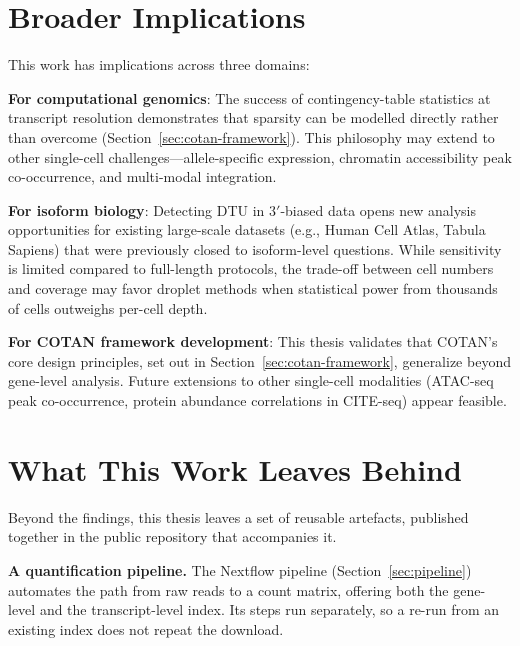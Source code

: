 \section{Broader Implications}

This work has implications across three domains:

\textbf{For computational genomics}: The success of contingency-table statistics at transcript resolution demonstrates that sparsity can be modelled directly rather than overcome (Section~\ref{sec:cotan-framework}). This philosophy may extend to other single-cell challenges---allele-specific expression, chromatin accessibility peak co-occurrence, and multi-modal integration.

\textbf{For isoform biology}: Detecting DTU in $3'$-biased data opens new analysis opportunities for existing large-scale datasets (e.g., Human Cell Atlas, Tabula Sapiens) that were previously closed to isoform-level questions. While sensitivity is limited compared to full-length protocols, the trade-off between cell numbers and coverage may favor droplet methods when statistical power from thousands of cells outweighs per-cell depth.

\textbf{For COTAN framework development}: This thesis validates that COTAN's core design principles, set out in Section~\ref{sec:cotan-framework}, generalize beyond gene-level analysis. Future extensions to other single-cell modalities (ATAC-seq peak co-occurrence, protein abundance correlations in CITE-seq) appear feasible.

\section{What This Work Leaves Behind}

Beyond the findings, this thesis leaves a set of reusable artefacts, published together in the public repository that accompanies it.

\textbf{A quantification pipeline.} The Nextflow pipeline (Section~\ref{sec:pipeline}) automates the path from raw reads to a count matrix, offering both the gene-level and the transcript-level index. Its steps run separately, so a re-run from an existing index does not repeat the download.

